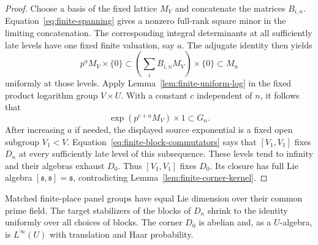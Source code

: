 \begin{proof}
Choose a basis of the fixed lattice $M_V$ and concatenate the
matrices $B_{i,n}$.  Equation~\eqref{eq:finite-spanning} gives a
nonzero full-rank square minor in the limiting concatenation.
The corresponding integral determinants at all sufficiently late
levels have one fixed finite valuation, say $a$.
The adjugate identity then yields
\[
 p^aM_V\times\{0\}
 \subset\left(\sum_iB_{i,n}M_V\right)\times\{0\}
 \subset M_n
\]
uniformly at those levels.
Apply Lemma~\ref{lem:finite-uniform-log} in the fixed product
logarithm group $V\times U$.  With a constant $c$ independent of
$n$, it follows that
\[
 \exp(p^{c+a}M_V)\times1\subset G_n.
\]
After increasing $a$ if needed, the displayed source exponential
is a fixed open subgroup $V_1<V$.
Equation~\eqref{eq:finite-block-commutators} says that $[V_1,V_1]$
fixes $D_n$ at every sufficiently late level of this subsequence.
These levels tend to infinity and their algebras exhaust $D_0$.
Thus $[V_1,V_1]$ fixes $D_0$.
Its closure has full Lie algebra
$[\mathfrak s,\mathfrak s]=\mathfrak s$, contradicting
Lemma~\ref{lem:finite-corner-kernel}.
\end{proof}

\begin{proposition}
\label{prop:finite-dimensions}
Matched finite-place panel groups have equal Lie dimension over
their common prime field.  The target stabilizers of the blocks of
$D_n$ shrink to the identity uniformly over all choices of blocks.
The corner $D_0$ is abelian and, as a $U$-algebra, is
$L^\infty(U)$ with translation and Haar probability.
\end{proposition}

